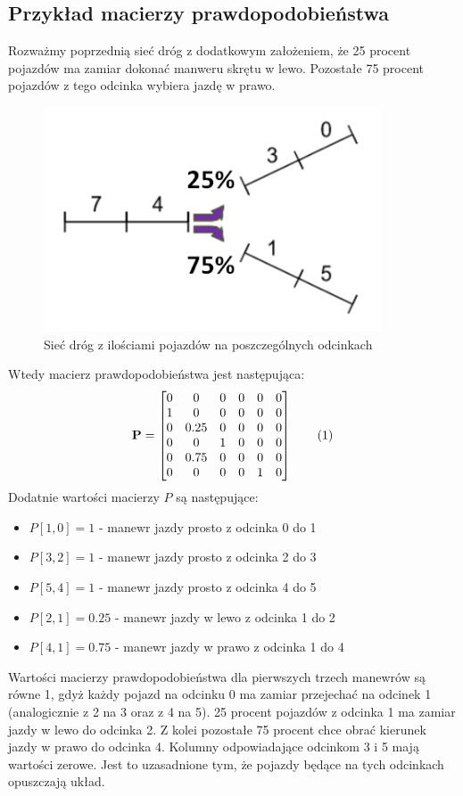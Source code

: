 \documentclass[12pt]{book}
\theoremstyle{plain}
\newcommand\addtag{\refstepcounter{equation}
\renewcommand{\labelenumii}{\theenumii}
\renewcommand{\theenumii}{\theenumi.\arabic{enumii}.}
\tag{\theequation}}
\begin{document}
\subsection{Przykład macierzy prawdopodobieństwa}
Rozważmy poprzednią sieć dróg z dodatkowym założeniem, że 25 procent pojazdów ma zamiar dokonać manweru skrętu w lewo. Pozostałe 75 procent pojazdów z tego odcinka wybiera jazdę w prawo.
\begin{figure}[H]
	\centering
	\includegraphics[width=10cm]{images/env_11_743015_procenty}
	\caption{Sieć dróg z ilościami pojazdów na poszczególnych odcinkach}
	\label{fig:3_single_road}
\end{figure}Wtedy macierz prawdopodobieństwa jest następująca:
\def \P {\begin{bmatrix}
		0 & 0 & 0 & 0 & 0 & 0 \\
		1 & 0 & 0 & 0 & 0 & 0 \\
		0 & 0.25 & 0 & 0 & 0 & 0 \\
		0 & 0 & 1 & 0 & 0 & 0 \\
		0 & 0.75 & 0 & 0 & 0 & 0 \\
		0 & 0 & 0 & 0 & 1 & 0 
\end{bmatrix}}
\[\textbf{P}=\P \addtag \label{eq:p_example} \]
Dodatnie wartości macierzy $P$ są następujące:
\begin{itemize}
	\item $P[1,0]=1$ - manewr jazdy prosto z odcinka 0 do 1
	\item $P[3,2]=1$ - manewr jazdy prosto z odcinka 2 do 3
	\item $P[5,4]=1$ - manewr jazdy prosto z odcinka 4 do 5
	\item $P[2,1]=0.25$ - manewr jazdy w lewo z odcinka 1 do 2
	\item $P[4,1]=0.75$ - manewr jazdy w prawo z odcinka 1 do 4
\end{itemize}
Wartości macierzy prawdopodobieństwa dla pierwszych trzech manewrów są równe 1, gdyż każdy pojazd na odcinku 0 ma zamiar przejechać na odcinek 1 (analogicznie z 2 na 3 oraz z 4 na 5). 25 procent pojazdów z odcinka 1 ma zamiar jazdy w lewo do odcinka 2. Z kolei pozostałe 75 procent chce obrać kierunek jazdy w prawo do odcinka 4. Kolumny odpowiadające odcinkom 3 i 5 mają wartości zerowe. Jest to uzasadnione tym, że pojazdy będące na tych odcinkach opuszczają układ.
\end{document}

